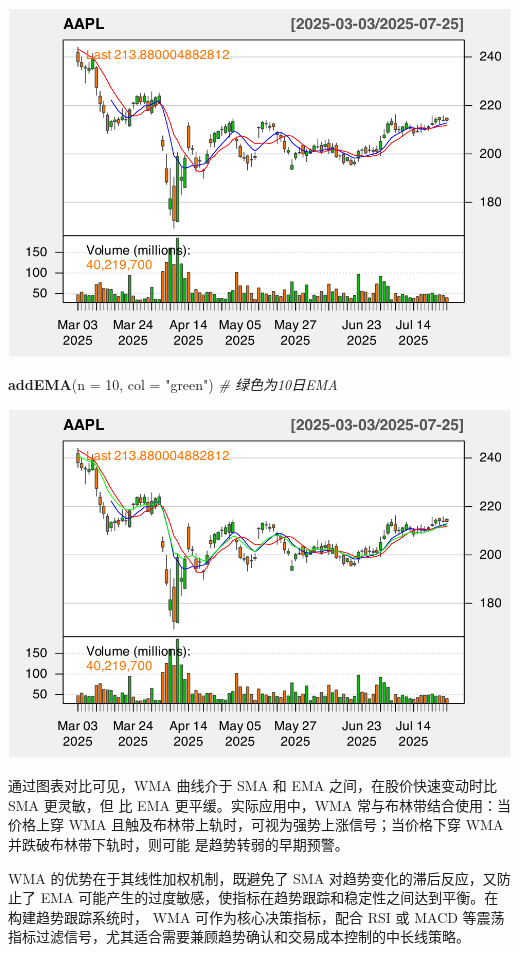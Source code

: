 \documentclass[]{ctexbook}
\newenvironment{Shaded}{\begin{snugshade}}{\end{snugshade}}
\newcommand{\AttributeTok}[1]{\textcolor[rgb]{0.13,0.29,0.53}{#1}}
\newcommand{\CommentTok}[1]{\textcolor[rgb]{0.56,0.35,0.01}{\textit{#1}}}
\newcommand{\DecValTok}[1]{\textcolor[rgb]{0.00,0.00,0.81}{#1}}
\newcommand{\FunctionTok}[1]{\textcolor[rgb]{0.13,0.29,0.53}{\textbf{#1}}}
\newcommand{\NormalTok}[1]{#1}
\newcommand{\StringTok}[1]{\textcolor[rgb]{0.31,0.60,0.02}{#1}}
\begin{document}
\includegraphics[width=0.9\linewidth]{QuantmodHandbook_files/figure-latex/wma-3}

\begin{Shaded}
\begin{Highlighting}[]
\FunctionTok{addEMA}\NormalTok{(}\AttributeTok{n =} \DecValTok{10}\NormalTok{, }\AttributeTok{col =} \StringTok{"green"}\NormalTok{)   }\CommentTok{\# 绿色为10日EMA}
\end{Highlighting}
\end{Shaded}

\includegraphics[width=0.9\linewidth]{QuantmodHandbook_files/figure-latex/wma-4}

通过图表对比可见，WMA 曲线介于 SMA 和 EMA 之间，在股价快速变动时比 SMA 更灵敏，但
比 EMA 更平缓。实际应用中，WMA 常与布林带结合使用：当价格上穿 WMA 且触及布林带上轨时，可视为强势上涨信号；当价格下穿 WMA 并跌破布林带下轨时，则可能
是趋势转弱的早期预警。

WMA 的优势在于其线性加权机制，既避免了 SMA 对趋势变化的滞后反应，又防止了 EMA 可能产生的过度敏感，使指标在趋势跟踪和稳定性之间达到平衡。在构建趋势跟踪系统时，
WMA 可作为核心决策指标，配合 RSI 或 MACD 等震荡指标过滤信号，尤其适合需要兼顾趋势确认和交易成本控制的中长线策略。
\end{document}
